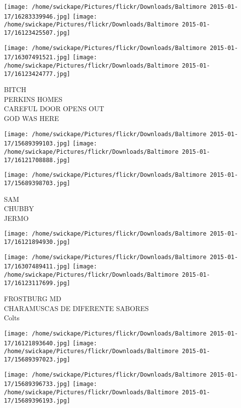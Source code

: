 \documentclass[10pt,letterpaper]{article}
\begin{document}
\texttt{[image: /home/swickape/Pictures/flickr/Downloads/Baltimore 2015-01-17/16283339946.jpg]}
\texttt{[image: /home/swickape/Pictures/flickr/Downloads/Baltimore 2015-01-17/16123425507.jpg]}

\texttt{[image: /home/swickape/Pictures/flickr/Downloads/Baltimore 2015-01-17/16307491521.jpg]}
\texttt{[image: /home/swickape/Pictures/flickr/Downloads/Baltimore 2015-01-17/16123424777.jpg]}

BITCH\\
PERKINS HOMES\\
CAREFUL DOOR OPENS OUT\\
GOD WAS HERE\\
\pagebreak

\texttt{[image: /home/swickape/Pictures/flickr/Downloads/Baltimore 2015-01-17/15689399103.jpg]}
\texttt{[image: /home/swickape/Pictures/flickr/Downloads/Baltimore 2015-01-17/16121708888.jpg]}

\texttt{[image: /home/swickape/Pictures/flickr/Downloads/Baltimore 2015-01-17/15689398703.jpg]}

SAM\\
CHUBBY\\
JERMO\\
\pagebreak

\texttt{[image: /home/swickape/Pictures/flickr/Downloads/Baltimore 2015-01-17/16121894930.jpg]}

\vspace{0.25in}
\texttt{[image: /home/swickape/Pictures/flickr/Downloads/Baltimore 2015-01-17/16307489411.jpg]}
\texttt{[image: /home/swickape/Pictures/flickr/Downloads/Baltimore 2015-01-17/16123117699.jpg]}

FROSTBURG MD\\
CHARAMUSCAS DE DIFERENTE SABORES\\
Colts\\
\pagebreak

\texttt{[image: /home/swickape/Pictures/flickr/Downloads/Baltimore 2015-01-17/16121893640.jpg]}
\texttt{[image: /home/swickape/Pictures/flickr/Downloads/Baltimore 2015-01-17/15689397023.jpg]}

\texttt{[image: /home/swickape/Pictures/flickr/Downloads/Baltimore 2015-01-17/15689396733.jpg]}
\texttt{[image: /home/swickape/Pictures/flickr/Downloads/Baltimore 2015-01-17/15689396193.jpg]}
\end{document}
